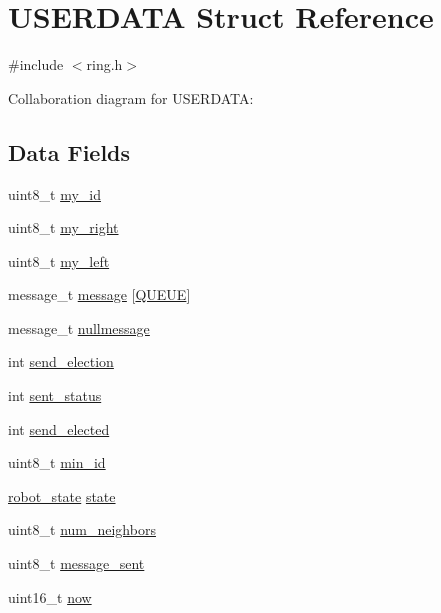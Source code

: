 \hypertarget{structUSERDATA}{}\section{U\+S\+E\+R\+D\+A\+TA Struct Reference}
\label{structUSERDATA}


{\ttfamily \#include $<$ring.\+h$>$}



Collaboration diagram for U\+S\+E\+R\+D\+A\+TA\+:
\subsection*{Data Fields}
\begin{DoxyCompactItemize}
\item 
uint8\+\_\+t \hyperlink{structUSERDATA_ac466d0aabad2b1c8e356a9560ae8913a}{my\+\_\+id}
\item 
uint8\+\_\+t \hyperlink{structUSERDATA_a842f5ca3ed1c6c461e4e1d6e4cec0a49}{my\+\_\+right}
\item 
uint8\+\_\+t \hyperlink{structUSERDATA_a7d0ce02a5de94525cf16e0580e0a415c}{my\+\_\+left}
\item 
message\+\_\+t \hyperlink{structUSERDATA_ac3815796eb2966d4f5e72f6d8e604f2d}{message} \mbox{[}\hyperlink{ring_8h_aafc57d44738df70f43ac87ed969eed47}{Q\+U\+E\+UE}\mbox{]}
\item 
message\+\_\+t \hyperlink{structUSERDATA_a4a1576ccb048198afdfe1220b6b45066}{nullmessage}
\item 
int \hyperlink{structUSERDATA_a001aed2103f59d4106c053f63c3adb60}{send\+\_\+election}
\item 
int \hyperlink{structUSERDATA_a8fbbd806d97836ce1928cba2f58f6784}{sent\+\_\+status}
\item 
int \hyperlink{structUSERDATA_abe61c104634e7f551a63e98c4dd4be80}{send\+\_\+elected}
\item 
uint8\+\_\+t \hyperlink{structUSERDATA_af160d2f2f0778c4ac7aac199d0da81ea}{min\+\_\+id}
\item 
\hyperlink{ring_8h_a69b20b1a04c8e4cf3b72851b966259ec}{robot\+\_\+state} \hyperlink{structUSERDATA_aeed785c38cdfd9bc4356b47287f4cc33}{state}
\item 
uint8\+\_\+t \hyperlink{structUSERDATA_aaa17d68b98a3923b1e67af7212d0ac52}{num\+\_\+neighbors}
\item 
uint8\+\_\+t \hyperlink{structUSERDATA_a72ffa67773e8814cf580efd6534eaea4}{message\+\_\+sent}
\item 
uint16\+\_\+t \hyperlink{structUSERDATA_afcf3cc6c2f239e554bc02618ab358e77}{now}

\end{DoxyCompactItemize}
